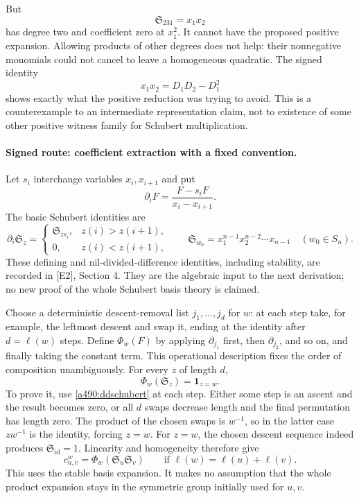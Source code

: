 \documentclass[11pt]{article}
\begin{document}
But
\[
                        \mathfrak S_{231}=x_1x_2
\]
has degree two and coefficient zero at $x_1^2$. It cannot have the proposed
positive expansion. Allowing products of other degrees does not help:
their nonnegative monomials could not cancel to leave a homogeneous
quadratic. The signed identity
\[
                        x_1x_2=D_1D_2-D_1^2
\]
shows exactly what the positive reduction was trying to avoid. This is a
counterexample to an intermediate representation claim, not to existence
of some other positive witness family for Schubert multiplication.

\paragraph{Signed route: coefficient extraction with a fixed convention.}
Let $s_i$ interchange variables $x_i,x_{i+1}$ and put
\[
                        \partial_i F=\frac{F-s_iF}{x_i-x_{i+1}}.
\]
The basic Schubert identities are
\begin{equation}\label{a490:ddschubert}
 \partial_i\mathfrak S_z=
 \begin{cases}
 \mathfrak S_{zs_i},&z(i)>z(i+1),\\
 0,&z(i)<z(i+1),
 \end{cases}
 \qquad
 \mathfrak S_{w_0}=x_1^{n-1}x_2^{n-2}\cdots x_{n-1}
 \quad(w_0\in S_n).
\end{equation}
These defining and nil-divided-difference identities, including stability,
are recorded in [E2], Section 4. They are the algebraic input to the next
derivation; no new proof of the whole Schubert basis theory is claimed.

Choose a deterministic descent-removal list $j_1,\ldots,j_d$ for $w$:
at each step take, for example, the leftmost descent and swap it, ending
at the identity after $d=\ell(w)$ steps. Define $\Phi_w(F)$ by applying
$\partial_{j_1}$ first, then $\partial_{j_2}$, and so on, and finally
taking the constant term. This operational description fixes the order of
composition unambiguously. For every $z$ of length $d$,
\begin{equation}\label{a490:duality}
                             \Phi_w(\mathfrak S_z)=\mathbf{1}_{z=w}.
\end{equation}
To prove it, use \eqref{a490:ddschubert} at each step. Either some step is
an ascent and the result becomes zero, or all $d$ swaps decrease length
and the final permutation has length zero. The product of the chosen swaps
is $w^{-1}$, so in the latter case $zw^{-1}$ is the identity, forcing
$z=w$. For $z=w$, the chosen descent sequence indeed produces
$\mathfrak S_{\mathrm{id}}=1$. Linearity and homogeneity therefore give
\begin{equation}\label{a490:extraction}
                     c_{u,v}^w=\Phi_w(\mathfrak S_u\mathfrak S_v)
          \qquad\text{if }\ell(w)=\ell(u)+\ell(v).
\end{equation}
This uses the stable basis expansion. It makes no assumption that the
whole product expansion stays in the symmetric group initially used for
$u,v$.
\end{document}
